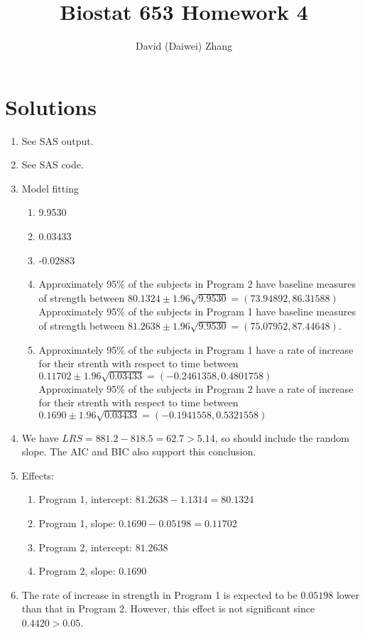 \documentclass{article}
\title{Biostat 653 Homework 4}
\author{David (Daiwei) Zhang}
\begin{document}
\maketitle

\section{Solutions}

\begin{enumerate}
\item See SAS output.
\item See SAS code.
\item Model fitting
  \begin{enumerate}
  \item 9.9530
  \item 0.03433
  \item -0.02883
  \item Approximately 95\% of the subjects in Program 2 have baseline measures of strength between $80.1324 \pm 1.96 \sqrt{9.9530} = (73.94892, 86.31588)$ \\
  Approximately 95\% of the subjects in Program 1 have baseline measures of strength between $81.2638 \pm 1.96 \sqrt{9.9530} = (75.07952, 87.44648)$.
  \item Approximately 95\% of the subjects in Program 1 have a rate of increase for their strenth with respect to time between $0.11702 \pm 1.96 \sqrt{0.03433} = (-0.2461358, 0.4801758)$ \\
  Approximately 95\% of the subjects in Program 2 have a rate of increase for their strenth with respect to time between $0.1690 \pm 1.96 \sqrt{0.03433} = (-0.1941558, 0.5321558)$
  \end{enumerate}
\item We have $LRS = 881.2 - 818.5 = 62.7 > 5.14$,
  so should include the random slope.
  The AIC and BIC also support this conclusion.
\item Effects:
  \begin{enumerate}
  \item Program 1, intercept: $81.2638 - 1.1314 = 80.1324$
  \item Program 1, slope: $0.1690 - 0.05198 = 0.11702$
  \item Program 2, intercept: $81.2638$
  \item Program 2, slope: $0.1690$
  \end{enumerate}
  \item The rate of increase in strength in Program 1 is expected to be $0.05198$ lower than that in Program 2. However, this effect is not significant since $0.4420 > 0.05$.

\end{enumerate}
\end{document}
